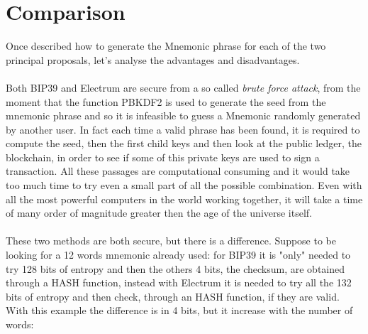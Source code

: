 \section{Comparison}
Once described how to generate the Mnemonic phrase for each of the two principal proposals, let's analyse the advantages and disadvantages.
\\ \\
Both BIP39 and Electrum are secure from a so called \textit{brute force attack}, from the moment that the function PBKDF2 is used to generate the seed from the mnemonic phrase and so it is infeasible to guess a Mnemonic randomly generated by another user. In fact each time  a valid phrase has been found, it is required to compute the seed, then the first child keys and then look at the public ledger, the blockchain, in order to see if some of this private keys are used to sign a transaction. All these passages are computational consuming and it would take too much time to try even a small part of all the possible combination. Even with all the most powerful computers in the world working together, it will take a time of many order of magnitude greater then the age of the universe itself.
\\ \\
These two methods are both secure, but there is a difference. Suppose to be looking for a 12 words mnemonic already used: for BIP39 it is "only" needed to try 128 bits of entropy and then the others 4 bits, the checksum, are obtained through a HASH function, instead with Electrum it is needed to try all the 132 bits of entropy and then check, through an HASH function, if they are valid. With this example the difference is in 4 bits, but it increase with the number of words:

